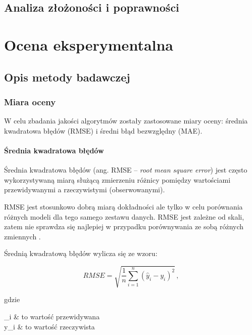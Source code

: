 \documentclass[twoside]{iisthesis}
\begin{document}
	 
	 \section{Analiza złożoności i poprawności}
 
 
\chapter{Ocena eksperymentalna}
	\section{Opis metody badawczej}
	
		\subsection{Miara oceny}
	
		W celu zbadania jakości algorytmów zostały zastosowane miary oceny: średnia kwadratowa błędów (RMSE) i średni błąd bezwzględny (MAE).
		
		\subsubsection{Średnia kwadratowa błędów}
	
		Średnia kwadratowa błędów (ang. RMSE -- \textit{root mean square error}) jest często wykorzystywaną miarą służącą zmierzeniu różnicy pomiędzy wartościami przewidywanymi a rzeczywistymi (obserwowanymi). 
		
		RMSE jest stosunkowo dobrą miarą dokładności ale tylko w celu porównania  różnych modeli dla tego samego zestawu danych. RMSE jest zależne od skali, zatem nie sprawdza się najlepiej w przypadku porównywania ze sobą różnych zmiennych \cite{hyndman2006another}.
		
		Średnią kwadratową błędów wylicza się ze wzoru:
		
		\begin{equation}
			\label{eq:rmse}
			RMSE = \sqrt{ \frac{1}{n} \sum_{i=1}^{n} (\hat{y}_i - y_i)^2 }
			\,,
		\end{equation}
	
		gdzie
		
		\begin{conditions*}
			_i & to wartość przewidywana \\
			y_i  &  to wartość rzeczywista
		\end{conditions*} 
		
\end{document}
